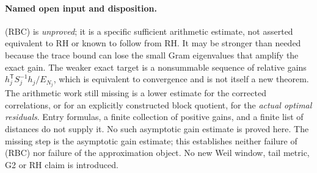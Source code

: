 \paragraph{Named open input and disposition.}
(RBC) is \emph{unproved}; it is a specific sufficient arithmetic estimate,
not asserted equivalent to RH or known to follow from RH. It may be
stronger than needed because the trace bound can lose the small
Gram eigenvalues that amplify the exact gain. The weaker exact target is
a nonsummable sequence of relative gains
$h_j^{\mathsf T}S_j^{-1}h_j/E_{N_j}$, which is equivalent to convergence
and is not itself a new theorem. The arithmetic work still missing is
a lower estimate for the corrected correlations, or for an explicitly
constructed block quotient, for the \emph{actual optimal residuals}.
Entry formulas, a finite collection of positive gains, and a finite list of distances
do not supply it. No such asymptotic gain estimate is proved here.
The missing step is the asymptotic gain estimate; this establishes
neither failure of (RBC) nor failure of the approximation object. No new Weil window, tail metric, G2 or RH
claim is introduced.
